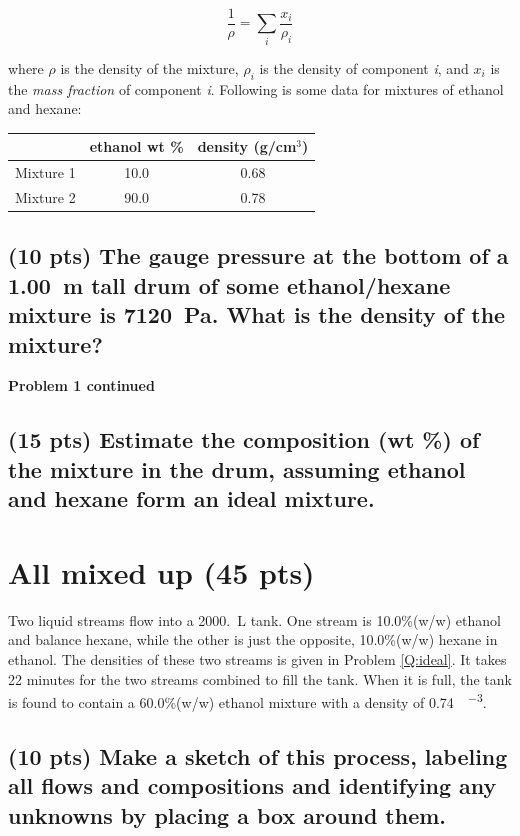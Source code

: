 \documentclass[11pt]{article}
\begin{document}
\[ \frac{1}{\rho} = \sum_{i} \frac{x_{i}}{\rho_{i}} \]

\noindent where \(\rho\) is the density of the mixture, \(\rho_{i}\) is the density of component \emph{i}, and \(x_{i}\) is the \emph{mass fraction} of component \emph{i}.  Following is some data for mixtures of ethanol and hexane:

\begin{center}
\begin{tabular}{lcc}
\hline
 & ethanol wt \% & density (g/cm\(^{3}\))\\
\hline
Mixture 1 & 10.0 & 0.68\\
Mixture 2 & 90.0 & 0.78\\
\hline
\end{tabular}
\end{center}

\subsection{(10 pts) The gauge pressure at the bottom of a \SI{1.00}{\meter} tall drum of some ethanol/hexane mixture is \SI{7120}{\pascal}.  What is the density of the mixture?}
\label{sec-1-1}

\newpage
\noindent \textbf{Problem 1 continued}
\subsection{(15 pts) Estimate the composition (wt \%) of the mixture in the drum, assuming ethanol and hexane form an ideal mixture.}
\label{sec-1-2}

\newpage
\section{All mixed up (45 pts)}
\label{sec-2}
Two liquid streams flow into a \SI{2000.}{\liter} tank.  One stream is
10.0\%(w/w) ethanol and balance hexane, while the other is just the opposite,
10.0\%(w/w) hexane in ethanol. The densities of these two streams is given in
Problem \ref{Q:ideal}. It takes 22 minutes for the two streams combined to fill
the tank.  When it is full, the tank is found to contain a 60.0\%(w/w) ethanol
mixture with a density of \SI{0.74}{\grams\per\centimeter\cubed}.

\subsection{(10 pts) Make a sketch of this process, labeling all flows and compositions and identifying any unknowns by placing a box around them.}
\label{sec-2-1}
\vspace{10cm}
\end{document}
